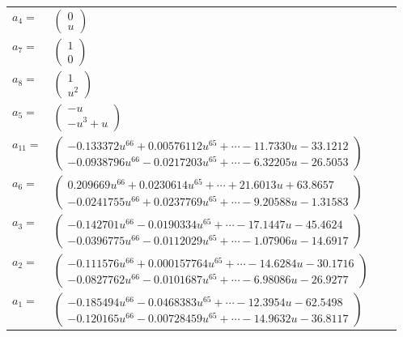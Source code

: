 \documentclass[1p]{elsarticle_modified}
\theoremstyle{definition}
\begin{document}
\begin{tabular}{m{7pt} m{180pt} m{7pt} m{180pt} }
\flushright $a_{4}=$&$\begin{pmatrix}0\\u\end{pmatrix}$ \\
\flushright $a_{7}=$&$\begin{pmatrix}1\\0\end{pmatrix}$ \\
\flushright $a_{8}=$&$\begin{pmatrix}1\\u^2\end{pmatrix}$ \\
\flushright $a_{5}=$&$\begin{pmatrix}- u\\- u^3+u\end{pmatrix}$ \\
\flushright $a_{11}=$&$\begin{pmatrix}-0.133372 u^{66}+0.00576112 u^{65}+\cdots-11.7330 u-33.1212\\-0.0938796 u^{66}-0.0217203 u^{65}+\cdots-6.32205 u-26.5053\end{pmatrix}$ \\
\flushright $a_{6}=$&$\begin{pmatrix}0.209669 u^{66}+0.0230614 u^{65}+\cdots+21.6013 u+63.8657\\-0.0241755 u^{66}+0.0237769 u^{65}+\cdots-9.20588 u-1.31583\end{pmatrix}$ \\
\flushright $a_{3}=$&$\begin{pmatrix}-0.142701 u^{66}-0.0190334 u^{65}+\cdots-17.1447 u-45.4624\\-0.0396775 u^{66}-0.0112029 u^{65}+\cdots-1.07906 u-14.6917\end{pmatrix}$ \\
\flushright $a_{2}=$&$\begin{pmatrix}-0.111576 u^{66}+0.000157764 u^{65}+\cdots-14.6284 u-30.1716\\-0.0827762 u^{66}-0.0101687 u^{65}+\cdots-6.98086 u-26.9277\end{pmatrix}$ \\
\flushright $a_{1}=$&$\begin{pmatrix}-0.185494 u^{66}-0.0468383 u^{65}+\cdots-12.3954 u-62.5498\\-0.120165 u^{66}-0.00728459 u^{65}+\cdots-14.9632 u-36.8117\end{pmatrix}$ \\

\end{tabular}
\end{document}
